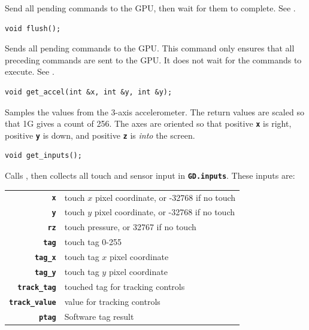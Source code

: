 \documentclass[10pt]{book}
\newcommand{\mach}[1]{\texttt{\textbf{#1}}}
\begin{document}
Send all pending commands to the GPU, then wait for them to complete.
See .

\newpage
{}

\begin{framed}
\begin{verbatim}
void flush();
\end{verbatim}
\end{framed}

Sends all pending commands to the GPU.
This command only ensures that all preceding commands are sent to the GPU.
It does not wait for the commands to execute. See .


\begin{framed}
\begin{verbatim}
void get_accel(int &x, int &y, int &y);
\end{verbatim}
\end{framed}

Samples the values from the 3-axis accelerometer.
The return values are scaled so that 1G gives a count of 256.
The axes are oriented so that positive \mach{x} is right,
positive \mach{y} is down, and positive \mach{z} is \emph{into} the screen.


\begin{framed}
\begin{verbatim}
void get_inputs();
\end{verbatim}
\end{framed}

Calls , then
collects all touch and sensor input in \mach{GD.inputs}.
These inputs are:

\vspace{10pt}
\begin{tabular}{rl}
\mach{x} & touch $x$ pixel coordinate, or -32768 if no touch \\
\mach{y} & touch $y$ pixel coordinate, or -32768 if no touch \\
\mach{rz} & touch pressure, or 32767 if no touch \\
\mach{tag} & touch tag 0-255 \\
\mach{tag\_x} & touch tag $x$ pixel coordinate \\
\mach{tag\_y} & touch tag $y$ pixel coordinate \\
\mach{track\_tag} & touched tag for tracking controls \\
\mach{track\_value} & value for tracking controls \\
\mach{ptag} & Software tag result \\
\end{tabular}
\end{document}

